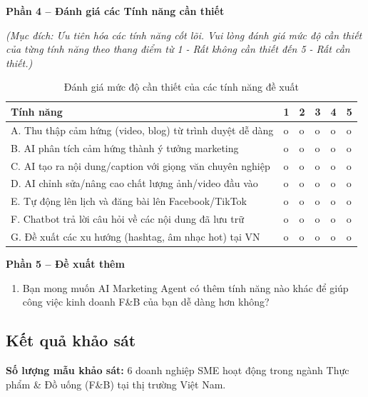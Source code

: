 \textbf{Phần 4 -- Đánh giá các Tính năng cần thiết}

\emph{(Mục đích: Ưu tiên hóa các tính năng cốt lõi. Vui lòng đánh giá
mức độ cần thiết của từng tính năng theo thang điểm từ 1 - Rất không cần
thiết đến 5 - Rất cần thiết.)}

\begin{table}[H]
\centering
\caption{Đánh giá mức độ cần thiết của các tính năng đề xuất}
\label{tab:danh_gia_tinh_nang}
\small %
\begin{tabular}{p{7.5cm} *{5}{>{\centering\arraybackslash}p{1.2cm}}}
\toprule
\textbf{Tính năng} & 
\textbf{1} & 
\textbf{2} & 
\textbf{3} & 
\textbf{4} & 
\textbf{5} \\
\midrule
A. Thu thập cảm hứng (video, blog) từ trình duyệt dễ dàng & o & o & o & o & o \\
B. AI phân tích cảm hứng thành ý tưởng marketing & o & o & o & o & o \\
C. AI tạo ra nội dung/caption với giọng văn chuyên nghiệp & o & o & o & o & o \\
D. AI chỉnh sửa/nâng cao chất lượng ảnh/video đầu vào & o & o & o & o & o \\
E. Tự động lên lịch và đăng bài lên Facebook/TikTok & o & o & o & o & o \\
F. Chatbot trả lời câu hỏi về các nội dung đã lưu trữ & o & o & o & o & o \\
G. Đề xuất các xu hướng (hashtag, âm nhạc hot) tại VN & o & o & o & o & o \\
\bottomrule
\end{tabular}
\end{table}

\textbf{Phần 5 -- Đề xuất thêm}

\begin{enumerate}
\def\labelenumi{\arabic{enumi}.}
\setcounter{enumi}{11}
\item
  Bạn mong muốn AI Marketing Agent có thêm tính năng nào khác để giúp
  công việc kinh doanh F\&B của bạn dễ dàng hơn không?
\end{enumerate}

\subsection{Kết quả khảo
sát}\label{kux1ebft-quux1ea3-khux1ea3o-suxe1t}

\textbf{Số lượng mẫu khảo sát:} 6 doanh nghiệp SME hoạt động trong ngành
Thực phẩm \& Đồ uống (F\&B) tại thị trường Việt Nam.

